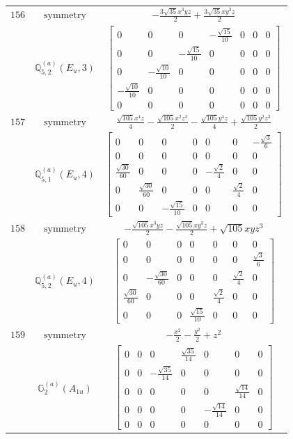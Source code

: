 \documentclass[fleqn,8pt,landscape]{jsarticle}
\begin{document}
\begin{longtable}{ccc}
$ 156 $ & $ \text{symmetry} $ & $ - \frac{3 \sqrt{35} x^{3} y z}{2} + \frac{3 \sqrt{35} x y^{3} z}{2} $ \\
$  $ & $ \mathbb{Q}_{5,2}^{(a)}(E_{u},3) $ & $ \begin{bmatrix} 0 & 0 & 0 & - \frac{\sqrt{15}}{10} & 0 & 0 & 0 \\ 0 & 0 & - \frac{\sqrt{15}}{10} & 0 & 0 & 0 & 0 \\ 0 & - \frac{\sqrt{10}}{10} & 0 & 0 & 0 & 0 & 0 \\ - \frac{\sqrt{10}}{10} & 0 & 0 & 0 & 0 & 0 & 0 \\ 0 & 0 & 0 & 0 & 0 & 0 & 0 \end{bmatrix} $ \\ \hline
$ 157 $ & $ \text{symmetry} $ & $ \frac{\sqrt{105} x^{4} z}{4} - \frac{\sqrt{105} x^{2} z^{3}}{2} - \frac{\sqrt{105} y^{4} z}{4} + \frac{\sqrt{105} y^{2} z^{3}}{2} $ \\
$  $ & $ \mathbb{Q}_{5,1}^{(a)}(E_{u},4) $ & $ \begin{bmatrix} 0 & 0 & 0 & 0 & 0 & 0 & - \frac{\sqrt{3}}{6} \\ 0 & 0 & 0 & 0 & 0 & 0 & 0 \\ \frac{\sqrt{30}}{60} & 0 & 0 & 0 & - \frac{\sqrt{2}}{4} & 0 & 0 \\ 0 & \frac{\sqrt{30}}{60} & 0 & 0 & 0 & \frac{\sqrt{2}}{4} & 0 \\ 0 & 0 & - \frac{\sqrt{15}}{10} & 0 & 0 & 0 & 0 \end{bmatrix} $ \\ \hline
$ 158 $ & $ \text{symmetry} $ & $ - \frac{\sqrt{105} x^{3} y z}{2} - \frac{\sqrt{105} x y^{3} z}{2} + \sqrt{105} x y z^{3} $ \\
$  $ & $ \mathbb{Q}_{5,2}^{(a)}(E_{u},4) $ & $ \begin{bmatrix} 0 & 0 & 0 & 0 & 0 & 0 & 0 \\ 0 & 0 & 0 & 0 & 0 & 0 & \frac{\sqrt{3}}{6} \\ 0 & - \frac{\sqrt{30}}{60} & 0 & 0 & 0 & \frac{\sqrt{2}}{4} & 0 \\ \frac{\sqrt{30}}{60} & 0 & 0 & 0 & \frac{\sqrt{2}}{4} & 0 & 0 \\ 0 & 0 & 0 & \frac{\sqrt{15}}{10} & 0 & 0 & 0 \end{bmatrix} $ \\ \hline
$ 159 $ & $ \text{symmetry} $ & $ - \frac{x^{2}}{2} - \frac{y^{2}}{2} + z^{2} $ \\
$  $ & $ \mathbb{G}_{2}^{(a)}(A_{1u}) $ & $ \begin{bmatrix} 0 & 0 & 0 & \frac{\sqrt{35}}{14} & 0 & 0 & 0 \\ 0 & 0 & - \frac{\sqrt{35}}{14} & 0 & 0 & 0 & 0 \\ 0 & 0 & 0 & 0 & 0 & \frac{\sqrt{14}}{14} & 0 \\ 0 & 0 & 0 & 0 & - \frac{\sqrt{14}}{14} & 0 & 0 \\ 0 & 0 & 0 & 0 & 0 & 0 & 0 \end{bmatrix} $ \\ \hline

\end{longtable}
\end{document}
